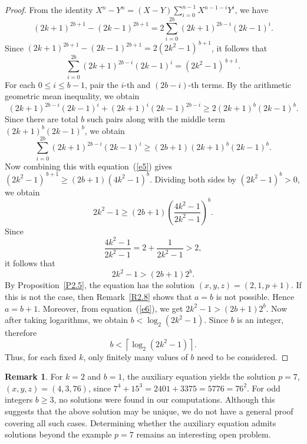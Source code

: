 \documentclass[reqno,12pt]{amsart}
\theoremstyle{definition}
\newtheorem{remark}[theorem]{Remark}
\begin{document}
\begin{proof}
	
From the identity $\displaystyle X^n-Y^n=(X-Y)\sum_{i=0}^{n-1}X^{n-1-i}Y^i$,	we have 
\begin{equation*}
	(2k+1)^{2b+1}-(2k-1)^{2b+1} = 2\sum_{i=0}^{2b}(2k+1)^{2b-i}(2k-1)^i.
\end{equation*}
Since $(2k+1)^{2b+1}-(2k-1)^{2b+1} = 2(2k^2-1)^{\,b+1}$, it follows that
\begin{equation}\label{e5}
	\sum_{i=0}^{2b}(2k+1)^{2b-i}(2k-1)^i = (2k^2-1)^{\,b+1}. 
\end{equation}
For each $0\le i\le b-1$, pair the $i$-th and $(2b-i)$-th terms.  By the arithmetic geometric mean inequality, we obtain
\begin{equation*}
	(2k+1)^{2b-i}(2k-1)^i + (2k+1)^i(2k-1)^{2b-i} \ge 2(2k+1)^b(2k-1)^b.
\end{equation*}
Since there are total $b$ such pairs along with the middle term $(2k+1)^b(2k-1)^b$, we obtain
\begin{equation*}
	\sum_{i=0}^{2b}(2k+1)^{2b-i}(2k-1)^i \ge (2b+1)(2k+1)^b(2k-1)^b.
\end{equation*}
Now combining this with equation~(\ref{e5}) gives $(2k^2-1)^{\,b+1}\ge(2b+1)(4k^2-1)^b$. Dividing both sides by $(2k^2-1)^b>0$, we obtain
\begin{equation*}
	2k^2-1 \ge	(2b+1)	\left(\frac{4k^2-1}{2k^2-1}\right)^b.
\end{equation*}
Since
\begin{equation*}
	\frac{4k^2-1}{2k^2-1} = 2+\frac{1}{2k^2-1}>2,
\end{equation*}
it follows that
\begin{equation}\label{e6}
	2k^2-1	>	(2b+1)2^b.
\end{equation}	
By Proposition~\ref{P2.5}, the equation has the solution $(x,y,z)=(2,1,p+1)$. If this is not the case, then Remark~\ref{R2.8} shows that $a=b$ is not possible. Hence $a=b+1$. 
Moreover, from equation~(\ref{e6}), we get $2k^2-1>(2b+1)2^b$. Now after taking logarithms, we obtain $b<\log_2(2k^2-1)$. 
Since $b$ is an integer, therefore
\begin{equation*}
	b<\left\lceil\log_2(2k^2-1)\right\rceil.
\end{equation*}
Thus, for each fixed $k$, only finitely many values of $b$ need to be considered.
\end{proof}
\begin{remark}
For $k=2$ and $b=1$, the auxiliary equation yields the solution	$p=7$, $(x,y,z)=(4,3,76)$, since $7^4+15^3=2401+3375=5776=76^2$. 
For odd integers $b\ge3$, no solutions were found in our computations. Although this suggests that the above solution may be unique, we do not have a general proof covering all such cases. 
Determining whether the auxiliary equation admits solutions beyond the example $p=7$ remains an interesting open problem.
\end{remark}
\end{document}
